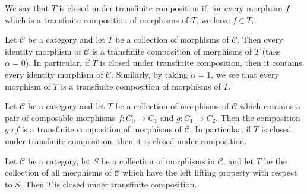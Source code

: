 We say that $T$ is closed under transfinite composition if, for every morphism $f$ which is a transfinite composition of morphisms of $T$, we have $f\in T$.
\begin{example}
Let $\mathcal{C}$ be a category and let $T$ be a collection of morphisms of $\mathcal{C}$. Then every identity morphism of $\mathcal{C}$ is a transfinite composition of morphisms of $T$ (take $\alpha=0$). In particular, if $T$ is closed under transfinite composition, then it contains every identity morphism of $\mathcal{C}$. Similarly, by taking $\alpha=1$, we see that every morphism of $T$ is a transfinite composition of morphisms of $T$.
\end{example}
\begin{example}
Let $\mathcal{C}$ be a category and let $T$ be a collection of morphisms of $\mathcal{C}$ which contains a pair of composable morphisms $f:C_0\to C_1$ and $g:C_1\to C_2$. Then the composition $g\circ f$ is a transfinite composition of morphisms of $\mathcal{C}$. In particular, if $T$ is closed under transfinite composition, then it is closed under
composition.
\end{example}
\begin{proposition}\label{category left lifting closed under transfinite composition}
Let $\mathcal{C}$ be a category, let $S$ be a collection of morphisms in $\mathcal{C}$, and let $T$ be the collection of all morphisms of $\mathcal{C}$ which have the left lifting property with respect to $S$. Then $T$ is closed under transfinite composition.
\end{proposition}
